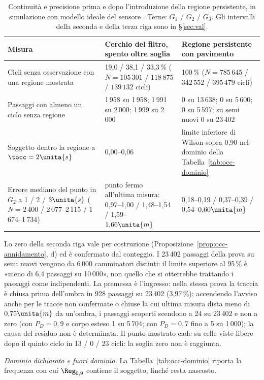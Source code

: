 \begin{table}[H]\centering\small
\caption{Continuità e precisione prima e dopo l'introduzione della regione persistente, in simulazione con modello ideale del sensore . Terne: $G_1$ / $G_2$ / $G_3$. Gli intervalli della seconda e della terza riga sono in \S\ref{sec:val}.}\label{tab:occ-prima-dopo}
\begin{tabularx}{\linewidth}{L L L}
\toprule
Misura & Cerchio del filtro, spento oltre soglia & Regione persistente con pavimento\\
\midrule
Cicli senza osservazione con una regione mostrata & 19,0 / 38,1 / 33,3\,\% ($N=105\,301$ / $118\,875$ / $139\,132$ cicli) & 100\,\% ($N=785\,645$ / $342\,552$ / $395\,479$ cicli)\\
Passaggi con almeno un ciclo senza regione & 1\,958 su 1\,958; 1\,991 su 2\,000; 1\,999 su 2\,000 & 0 su 13\,638; 0 su 5\,600; 0 su 5\,597; su semi nuovi 0 su 23\,402\\
Soggetto dentro la regione a $\tocc=2\unita{s}$ & 0,00--0,06 & limite inferiore di Wilson sopra 0,90 nel dominio della Tabella~\ref{tab:occ-dominio}\\
Errore mediano del punto in $G_2$ a 1 / 2 / $3\unita{s}$ ($N=2\,400$ / 2\,077--2\,115 / 1\,674--1\,734) & punto fermo all'ultima misura: 0,97--1,00 / 1,48--1,54 / 1,59--$1{,}66\unita{m}$ & 0,18--0,19 / 0,37--0,39 / 0,54--$0{,}60\unita{m}$\\
\bottomrule
\end{tabularx}
\end{table}

Lo zero della seconda riga vale per costruzione (Proposizione~\ref{prop:occ-annidamento}, d) ed è confermato dal conteggio. I 23\,402 passaggi della prova su semi nuovi vengono da 6\,000 camminatori distinti: il limite superiore al 95\,\% è «meno di 6,4 passaggi su 10\,000», non quello che si otterrebbe trattando i passaggi come indipendenti. La premessa è l'ingresso: nella stessa prova la traccia è chiusa prima dell'ombra in 928 passaggi su 23\,402 (3,97\,\%); accendendo l'avviso anche per le tracce non confermate o chiuse la cui ultima misura dista meno di $0{,}75\unita{m}$ da un'ombra, i passaggi scoperti scendono a 24 su 23\,402 e non a zero (con $P_D=0{,}9$ e corpo esteso 1 su 5\,704; con $P_D=0{,}7$ fino a 5 su 1\,000); la causa del residuo non è determinata. Il punto mostrato cade su celle viste libere dopo il quinto ciclo in 13 / 0 / 23 cicli: la soglia zero non è raggiunta.

\emph{Dominio dichiarato e fuori dominio.} La Tabella~\ref{tab:occ-dominio} riporta la frequenza con cui $\Reg_{0,9}$ contiene il soggetto, finché resta nascosto.

